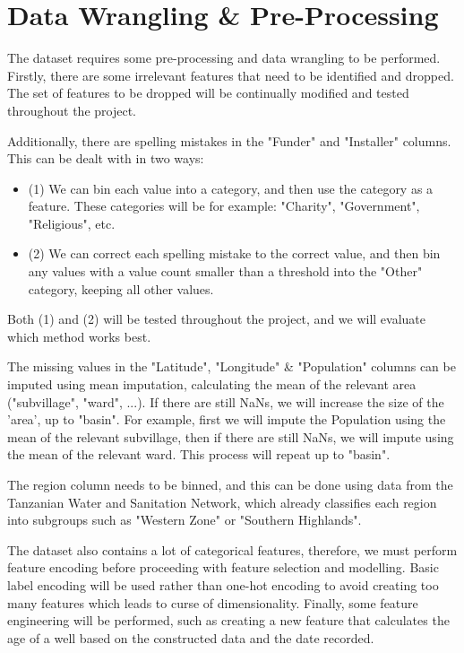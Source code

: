 \documentclass{article}
\begin{document}
\section{Data Wrangling \& Pre-Processing}

The dataset requires some pre-processing and data wrangling to be performed. Firstly, there are some irrelevant features that need to be identified and dropped. The set of features to be dropped will be continually modified and tested throughout the project.

Additionally, there are spelling mistakes in the "Funder" and "Installer" columns. This can be dealt with in two ways:
    \begin{itemize}
        \item (1) We can bin each value into a category, and then use the category as a feature. These categories will be for example: "Charity", "Government", "Religious", etc.
        \item (2) We can correct each spelling mistake to the correct value, and then bin any values with a value count smaller than a threshold into the "Other" category, keeping all other values.
    \end{itemize}

Both (1) and (2) will be tested throughout the project, and we will evaluate which method works best. 

The missing values in the "Latitude", "Longitude" \& "Population" columns can be imputed using mean imputation, calculating the mean of the relevant area ("subvillage", "ward", ...). If there are still NaNs, we will increase the size of the 'area', up to "basin". For example, first we will impute the Population using the mean of the relevant subvillage, then if there are still NaNs, we will impute using the mean of the relevant ward. This process will repeat up to "basin".

The region column needs to be binned, and this can be done using data from the Tanzanian Water and Sanitation Network, which already classifies each region into subgroups such as "Western Zone" or "Southern Highlands".

The dataset also contains a lot of categorical features, therefore, we must perform feature encoding before proceeding with feature selection and modelling. Basic label encoding will be used rather than one-hot encoding to avoid creating too many features which leads to curse of dimensionality. Finally, some feature engineering will be performed, such as creating a new feature that calculates the age of a well based on the constructed data and the date recorded.
\end{document}
